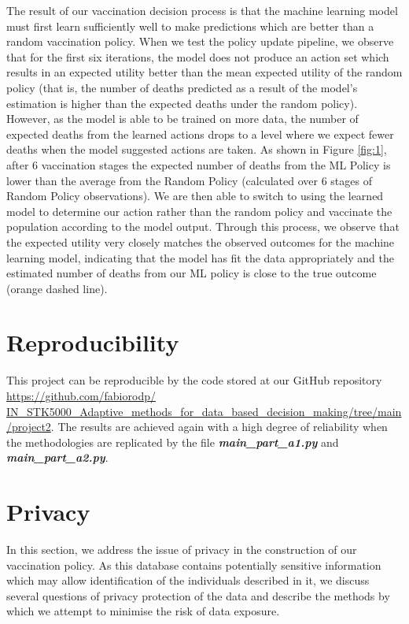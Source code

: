 \documentclass{article}
\begin{document}
The result of our vaccination decision process is that the machine learning model must first learn sufficiently well to make predictions which are better than a random vaccination policy. When we test the policy update pipeline, we observe that for the first six iterations, the model does not produce an action set which results in an expected utility better than the mean expected utility of the random policy (that is, the number of deaths predicted as a result of the model's estimation is higher than the expected deaths under the random policy). However, as the model is able to be trained on more data, the number of expected deaths from the learned actions drops to a level where we expect fewer deaths when the model suggested actions are taken. As shown in Figure \ref{fig:1}, after 6 vaccination stages the expected number of deaths from the ML Policy is lower than the average from the Random Policy (calculated over 6 stages of Random Policy observations). We are then able to switch to using the learned model to determine our action rather than the random policy and vaccinate the population according to the model output. Through this process, we observe that the expected utility very closely matches the observed outcomes for the machine learning model, indicating that the model has fit the data appropriately and the estimated number of deaths from our ML policy is close to the true outcome (orange dashed line). 

\section{Reproducibility}
\label{chap:Reproducibility}

This project can be reproducible by the code stored at our GitHub repository \href{https://github.com/fabiorodp/IN_STK5000_Adaptive_methods_for_data_based_decision_making/tree/main/project2}{https://github.com/fabiorodp/ IN\_STK5000\_Adaptive\_methods\_for\_data\_based\_decision\_making/tree/main/project2}. The results are achieved again with a high degree of reliability when the methodologies are replicated by the file \textbf{\textit{main\_part\_a1.py}} and \textbf{\textit{main\_part\_a2.py}}.

\section{Privacy}

In this section, we address the issue of privacy in the construction of our vaccination policy. As this database contains potentially sensitive information which may allow identification of the individuals described in it, we discuss several questions of privacy protection of the data and describe the methods by which we attempt to minimise the risk of data exposure.
\end{document}
